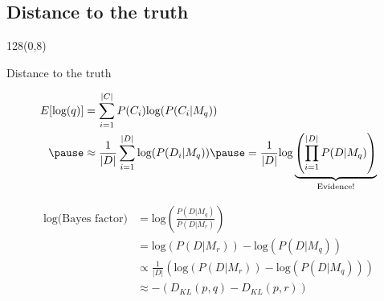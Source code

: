 \documentclass[shownotes]{beamer}
\begin{document}
\subsection{Distance to the truth}
\begin{frame}
\footnotesize
\begin{textblock}{128}(0,8)
\begin{center}
 \Large Distance to the truth
\end{center}
\end{textblock}
\vspace{0.75cm}
\end{frame}

\begin{frame}
 
 
\begin{equation*}
\begin{align*}
 E[\text{log}(q)] & = \sum_{i=1}^{|C|} P(C_i) \text{log}(P(C_i|M_q)) \\ 
 \pause & \approx  \frac{1}{|D|} \sum_{i=1}^{|D|} \text{log}(P(D_i|M_q)) \pause = \frac{1}{|D|} \text{log}\underbrace{\left(\prod_{i=1}^{|D|} P(D|M_q)\right)}_{\text{\scriptsize  Evidence!}}
\end{align*}
\end{equation*}

 
 \begin{equation*}
 \begin{align*}
\text{log(Bayes factor)} & = \text{log}\left(\frac{P(D|M_q)}{P(D|M_r)}\right) \\
& = \text{log}\left(P(D|M_r)\right) -\text{log}\left(P(D|M_q)\right) \\
& \propto \frac{1}{|D|} \left(\text{log}\left(P(D|M_r)\right) -\text{log}\left(P(D|M_q)\right)\right) \\
& \approx - (D_{KL}(p,q) - D_{KL}(p,r)) 
 \end{align*}
 \end{equation*}

 
\end{frame}
\end{document}
